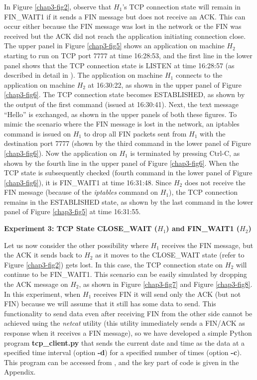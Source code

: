 \begin{multicols}{2}
In Figure \ref{chap3-fig2}, observe that $H_{1}$'s TCP connection state will remain in FIN\_WAIT1 if it sends a FIN message but does not receive an ACK. This can occur either because the FIN message was lost in the network or the FIN was received but the ACK did not reach the application initiating connection close. The upper panel in Figure \ref{chap3-fig5} shows an application on machine $H_{2}$ starting to run on TCP port 7777 at time 16:28:53, and the first line in the lower panel shows that the TCP connection state is LISTEN at time 16:28:57 (as described in detail in \cite{chap3-key8}). The application on machine $H_{1}$ connects to the application on machine $H_{2}$ at 16:30:22, as shown in the upper panel of Figure \ref{chap3-fig6}. The TCP connection state becomes ESTABLISHED, as shown by the output of the first command (issued at 16:30:41). Next, the text message ``Hello'' is exchanged, as shown in the upper panels of both these figures. To mimic the scenario where the FIN message is lost in the network, an iptables command is issued on $H_{1}$ to drop all FIN packets sent from $H_{1}$ with the destination port 7777 (shown by the third command in the lower panel of Figure \ref{chap3-fig6}). Now the application on $H_{1}$ is terminated by pressing Ctrl-C, as shown by the fourth line in the upper panel of Figure \ref{chap3-fig6}. When the TCP state is subsequently checked (fourth command in the lower panel of Figure \ref{chap3-fig6}), it is FIN\_WAIT1 at time 16:31:48. Since $H_{2}$ does not receive the FIN message (because of the \textit{iptables} command on $H_{1}$), the TCP connection remains in the ESTABLISHED state, as shown by the last command in the lower panel of Figure \ref{chap3-fig5} at 	time 16:31:55.

\medskip
\noindent
\textbf{Experiment 3: TCP State CLOSE\_WAIT (\boldmath$H_{1}$) and FIN\_WAIT1 ($H_{2}$)}
\smallskip

Let us now consider the other possibility where $H_{1}$ receives the FIN message, but the ACK it sends back to $H_{2}$ as it moves to the CLOSE\_WAIT state (refer to Figure \ref{chap3-fig2}) gets lost. In this case, the TCP connection state on $H_{2}$ will continue to be FIN\_WAIT1. This scenario can be easily simulated by dropping the ACK message on $H_{2}$, as shown in Figure \ref{chap3-fig7} and Figure \ref{chap3-fig8}. In this experiment, when $H_{1}$ receives FIN it will send only the ACK (but not FIN) because we will assume that it still has some data to send. This functionality to send data even after receiving FIN from the other side cannot be achieved using the \textit{netcat} utility (this utility immediately sends a FIN/ACK as response when it receives a FIN message), so we have developed a simple Python program \textbf{tcp\_client.py} that sends the current date and time as the data at a specified time interval (option \textbf{-d}) for a specified number of times (option \textbf{-c}). This program can be accessed from \cite{chap3-key10}, and the key part of code is given in the Appendix.
\end{multicols}

